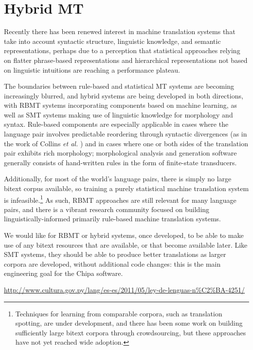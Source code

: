 \section{Hybrid MT}
Recently there has been renewed interest in machine translation systems that
take into account syntactic structure, linguistic knowledge, and semantic
representations, perhaps due to a perception that statistical approaches
relying on flatter phrase-based representations and hierarchical
representations not based on linguistic intuitions are reaching a performance
plateau.

The boundaries between rule-based and statistical MT systems are becoming
increasingly blurred, and hybrid systems are being developed in both
directions, with RBMT systems incorporating components based on machine
learning, as well as SMT systems making use of linguistic knowledge for
morphology and syntax.
Rule-based components are especially applicable in cases where the language
pair involves predictable reordering through syntactic divergences
(as in the work of Collins \emph{et al.}
\cite{collins-koehn-kucerova:2005:ACL})
and in cases where one or both sides of the translation pair exhibits rich
morphology; morphological analysis and generation software generally consists
of hand-written rules in the form of finite-state transducers.

Additionally, for most of the world's language pairs, there is simply no large
bitext corpus available, so training a purely statistical machine translation
system is infeasible.\footnote{Techniques for learning from comparable corpora,
such as translation spotting, are under development, and there has been some
work on building sufficiently large bitext corpora through crowdsourcing, but
these approaches have not yet reached wide adoption.}
As such, RBMT approaches are still relevant for many language pairs, and there
is a vibrant research community focused on building linguistically-informed
primarily rule-based machine translation systems.

We would like for RBMT or hybrid systems, once developed, to be able to make
use of any bitext resources that are available, or that become available later.
Like SMT systems, they should be able to produce better translations as larger
corpora are developed, without additional code changes: this is the main
engineering goal for the Chipa software.

\urldef{\leydelenguas}\url{http://www.cultura.gov.py/lang/es-es/2011/05/ley-de-lenguas-n%C2%BA-4251/}

